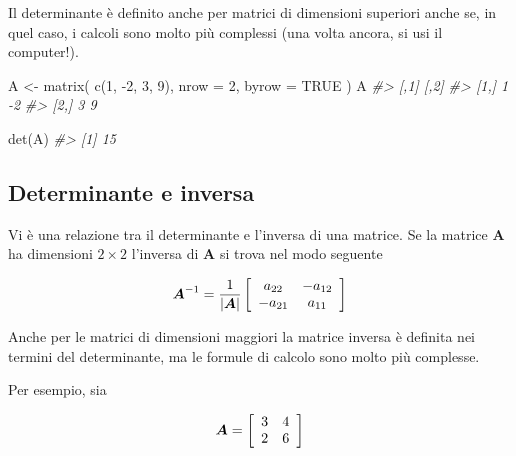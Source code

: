 \documentclass[
  11pt,
]{krantz}
\makeatletter
\newenvironment{Shaded}{\begin{snugshade}}{\end{snugshade}}
\newcommand{\AttributeTok}[1]{\textcolor[rgb]{0.61,0.61,0.61}{#1}}
\newcommand{\CommentTok}[1]{\textcolor[rgb]{0.37,0.37,0.37}{\textit{#1}}}
\newcommand{\ConstantTok}[1]{\textcolor[rgb]{0,0,0}{#1}}
\newcommand{\DecValTok}[1]{\textcolor[rgb]{0.06,0.06,0.06}{#1}}
\newcommand{\FunctionTok}[1]{\textcolor[rgb]{0,0,0}{#1}}
\newcommand{\NormalTok}[1]{#1}
\newcommand{\OtherTok}[1]{\textcolor[rgb]{0.37,0.37,0.37}{#1}}
\newcommand{\SpecialCharTok}[1]{\textcolor[rgb]{0,0,0}{#1}}
\newenvironment{kframe}{%
\medskip{}
\setlength{\fboxsep}{.8em}
 \def\at@end@of@kframe{}%
 \ifinner\ifhmode%
  \def\at@end@of@kframe{\end{minipage}}%
  \begin{minipage}{\columnwidth}%
 \fi\fi%
 \def\FrameCommand##1{\hskip\@totalleftmargin \hskip-\fboxsep
 \colorbox{shadecolor}{##1}\hskip-\fboxsep
     \hskip-\linewidth \hskip-\@totalleftmargin \hskip\columnwidth}%
 \MakeFramed {\advance\hsize-\width
   \@totalleftmargin\z@ \linewidth\hsize
   \@setminipage}}%
 {\par\unskip\endMakeFramed%
 \at@end@of@kframe}
\renewenvironment{Shaded}{\begin{kframe}}{\end{kframe}}
\theoremstyle{definition}
\theoremstyle{definition}
\theoremstyle{definition}
\theoremstyle{definition}
\theoremstyle{remark}
\makeatother
\begin{document}
Il determinante è definito anche per matrici di dimensioni superiori anche se, in quel caso, i calcoli sono molto più complessi (una volta ancora, si usi il computer!).

\begin{Shaded}
\begin{Highlighting}[]
\NormalTok{A }\OtherTok{\textless{}{-}} \FunctionTok{matrix}\NormalTok{(}
  \FunctionTok{c}\NormalTok{(}\DecValTok{1}\NormalTok{, }\SpecialCharTok{{-}}\DecValTok{2}\NormalTok{, }\DecValTok{3}\NormalTok{, }\DecValTok{9}\NormalTok{),}
  \AttributeTok{nrow =} \DecValTok{2}\NormalTok{,}
  \AttributeTok{byrow =} \ConstantTok{TRUE}
\NormalTok{)}
\NormalTok{A}
\CommentTok{\#\textgreater{}      [,1] [,2]}
\CommentTok{\#\textgreater{} [1,]    1   {-}2}
\CommentTok{\#\textgreater{} [2,]    3    9}
\end{Highlighting}
\end{Shaded}

\begin{Shaded}
\begin{Highlighting}[]
\FunctionTok{det}\NormalTok{(A)}
\CommentTok{\#\textgreater{} [1] 15}
\end{Highlighting}
\end{Shaded}

\hypertarget{determinante-e-inversa}{%
\subsection{Determinante e inversa}\label{determinante-e-inversa}}

Vi è una relazione tra il determinante e l'inversa di una matrice. Se la matrice \(\boldsymbol{A}\) ha dimensioni \(2 \times 2\) l'inversa di \(\boldsymbol{A}\) si trova nel modo seguente

\[
\boldsymbol{A}^{-1} = \frac{1}{|\boldsymbol{A}|} \left[
\begin{array}{c c}
a_{22} & -a_{12} \\
-a_{21} & a_{11}
\end{array}
 \right]
 \]

Anche per le matrici di dimensioni maggiori la matrice inversa è definita nei termini del determinante, ma le formule di calcolo sono molto più complesse.

Per esempio, sia

\[
\boldsymbol{A} = \left[ \begin{array}{c c}
3 & 4 \\
2 & 6
\end{array}
\right]
\]
\end{document}

